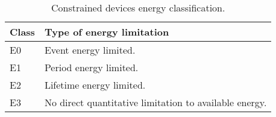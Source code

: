 	\begin{table}[h!]
		\begin{center}
			
			\begin{tabular}{|l|l|}
				\hline
				\textbf{Class} & \textbf{Type of energy limitation}\\
				\hline
				E0 & Event energy limited.\\\hline
				E1 & Period energy limited.\\\hline
				E2 & Lifetime energy limited.\\\hline
				E3 & No direct quantitative limitation to available energy.\\\hline
			\end{tabular}
			\caption{Constrained devices energy classification.}
			\label{tab:table2}
		\end{center}
	\end{table}